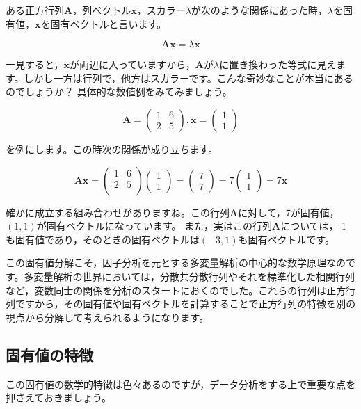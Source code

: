 \documentclass{ltjsbook}
\begin{document}
ある正方行列$\bm{A}$，列ベクトル$\bm{x}$，スカラー$\lambda$が次のような関係にあった時，$\lambda$を固有値，$\bm{x}$を固有ベクトルと言います。

\[ \bm{Ax} = \lambda\bm{x} \]

一見すると，$\bm{x}$が両辺に入っていますから，$\bm{A}$が$\lambda$に置き換わった等式に見えます。しかし一方は行列で，他方はスカラーです。こんな奇妙なことが本当にあるのでしょうか？
具体的な数値例をみてみましょう。

\[
    \bm{A} = \begin{pmatrix}
        1 & 6 \\ 2 & 5
    \end{pmatrix}
    ,\bm{x} = \begin{pmatrix}
        1 \\ 1
    \end{pmatrix}
\]

を例にします。この時次の関係が成り立ちます。

\[
    \bm{Ax} =
    \begin {pmatrix}
    1 & 6 \\
    2 & 5 \\
    \end{pmatrix}
    \begin{pmatrix}
        1 \\ 1
    \end{pmatrix}
    =
    \begin{pmatrix}
        7 \\ 7
    \end{pmatrix}
    =7
    \begin{pmatrix}
        1 \\ 1
    \end{pmatrix}
    =7 \bm{x}
\]

確かに成立する組み合わせがありますね。この行列$\bm{A}$に対して，7が固有値，$(1,1)$が固有ベクトルになっています。
また，実はこの行列$\bm{A}$については，-1も固有値であり，そのときの固有ベクトルは$(-3,1)$も固有ベクトルです。

この固有値分解こそ，因子分析を元とする多変量解析の中心的な数学原理なのです。多変量解析の世界においては，分散共分散行列やそれを標準化した相関行列など，変数同士の関係を分析のスタートにおくのでした。これらの行列は正方行列ですから，その固有値や固有ベクトルを計算することで正方行列の特徴を別の視点から分解して考えられるようになります。

\subsection{固有値の特徴}
この固有値の数学的特徴は色々あるのですが，データ分析をする上で重要な点を押さえておきましょう。
\end{document}
